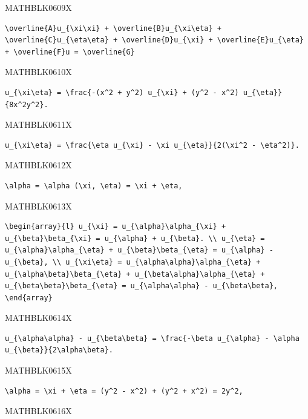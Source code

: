 \documentclass[
  ukrainian,
]{article}
\begin{document}
MATHBLK0609X

\begin{verbatim}
\overline{A}u_{\xi\xi} + \overline{B}u_{\xi\eta} + \overline{C}u_{\eta\eta} + \overline{D}u_{\xi} + \overline{E}u_{\eta} + \overline{F}u = \overline{G}
\end{verbatim}

MATHBLK0610X

\begin{verbatim}
u_{\xi\eta} = \frac{-(x^2 + y^2) u_{\xi} + (y^2 - x^2) u_{\eta}}{8x^2y^2}.
\end{verbatim}

MATHBLK0611X

\begin{verbatim}
u_{\xi\eta} = \frac{\eta u_{\xi} - \xi u_{\eta}}{2(\xi^2 - \eta^2)}.
\end{verbatim}

MATHBLK0612X

\begin{verbatim}
\alpha = \alpha (\xi, \eta) = \xi + \eta,
\end{verbatim}

MATHBLK0613X

\begin{verbatim}
\begin{array}{l} u_{\xi} = u_{\alpha}\alpha_{\xi} + u_{\beta}\beta_{\xi} = u_{\alpha} + u_{\beta}. \\ u_{\eta} = u_{\alpha}\alpha_{\eta} + u_{\beta}\beta_{\eta} = u_{\alpha} - u_{\beta}, \\ u_{\xi\eta} = u_{\alpha\alpha}\alpha_{\eta} + u_{\alpha\beta}\beta_{\eta} + u_{\beta\alpha}\alpha_{\eta} + u_{\beta\beta}\beta_{\eta} = u_{\alpha\alpha} - u_{\beta\beta}, \end{array}
\end{verbatim}

MATHBLK0614X

\begin{verbatim}
u_{\alpha\alpha} - u_{\beta\beta} = \frac{-\beta u_{\alpha} - \alpha u_{\beta}}{2\alpha\beta}.
\end{verbatim}

MATHBLK0615X

\begin{verbatim}
\alpha = \xi + \eta = (y^2 - x^2) + (y^2 + x^2) = 2y^2,
\end{verbatim}

MATHBLK0616X
\end{document}
